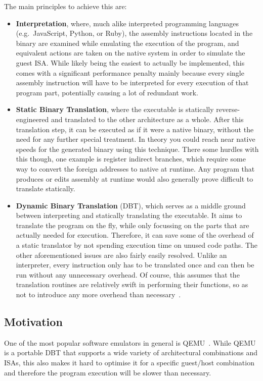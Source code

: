 The main principles to achieve this are:
\begin{itemize}
    \item \textbf{Interpretation}, where, much alike interpreted programming languages (e.g.\ JavaScript, Python, or Ruby), the assembly instructions located in the binary are examined while emulating the execution of the program, and equivalent actions are taken on the native system in order to simulate the guest ISA\@.
        \subitem While likely being the easiest to actually be implemented, this comes with a significant performance penalty mainly because every single assembly instruction will have to be interpreted for every execution of that program part, potentially causing a lot of redundant work.
    \item \textbf{Static Binary Translation}, where the executable is statically reverse-engineered and translated to the other architecture as a whole.
    After this translation step, it can be executed as if it were a native binary, without the need for any further special treatment.
    In theory you could reach near native speeds for the generated binary using this technique.
    There some hurdles with this though, one example is register indirect branches, which require some way to convert the foreign addresses to native at runtime.
    Any program that produces or edits assembly at runtime would also generally prove difficult to translate statically.
    \item \textbf{Dynamic Binary Translation} (DBT), which serves as a middle ground between interpreting and statically translating the executable.
    It aims to translate the program on the fly, while only focussing on the parts that are actually needed for execution.
    Therefore, it can save some of the overhead of a static translator by not spending execution time on unused code paths.
    The other aforementioned issues are also fairly easily resolved.
    Unlike an interpreter, every instruction only has to be translated once and can then be run without any unnecessary overhead.
    Of course, this assumes that the translation routines are relatively swift in performing their functions, so as not to introduce any more overhead than necessary~\cite[S. 1f.]{bintrans}.
\end{itemize}

\subsection{Motivation}
One of the most popular software emulators in general is QEMU~\cite{bellard2005qemu}\@.
While QEMU is a portable DBT that supports a wide variety of architectural combinations and ISAs, this also makes it hard to optimise it for a specific guest/host combination and therefore the program execution will be slower than necessary.

